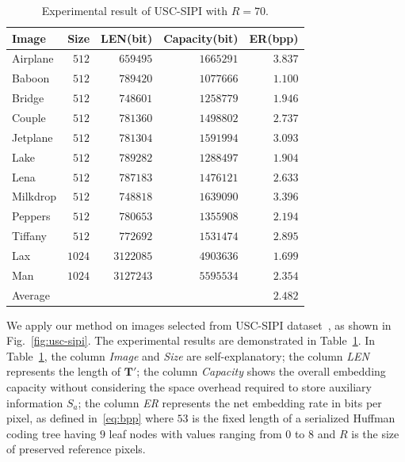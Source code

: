 \documentclass[journal]{IEEEtran}
\begin{document}
	\begin{table}[!t]
		\centering
		\caption{Experimental result of USC-SIPI with \(R = 70\).}
		\label{tab:usc}
		\begin{tabular}{l  r r r   r }
			\toprule
			Image 	  & Size   & LEN(bit)  & Capacity(bit) & ER(bpp)	\\ 
			\midrule
			Airplane  & $512$  & $659495$  & $1665291$ & $3.837$	\\
			Baboon    & $512$  & $789420$  & $1077666$ & $1.100$	\\
			Bridge    & $512$  & $748601$  & $1258779$ & $1.946$	\\
			Couple    & $512$  & $781360$  & $1498802$ & $2.737$	\\
			Jetplane  & $512$  & $781304$  & $1591994$ & $3.093$	\\
			Lake      & $512$  & $789282$  & $1288497$ & $1.904$	\\
			Lena      & $512$  & $787183$  & $1476121$ & $2.633$	\\
			Milkdrop  & $512$  & $748818$  & $1639090$ & $3.396$	\\
			Peppers   & $512$  & $780653$  & $1355908$ & $2.194$	\\
			Tiffany   & $512$  & $772692$  & $1531474$ & $2.895$	\\
			Lax       & $1024$ & $3122085$ & $4903636$ & $1.699$	\\
			Man       & $1024$ & $3127243$ & $5595534$ & $2.354$	\\
			\midrule
			Average	  & &&& $2.482$ \\
			\bottomrule
		\end{tabular}
	\end{table}
	
	We apply our method on images selected from USC-SIPI dataset~\cite{UniversityofSouthernCalifornia2020}, as shown in Fig.~\ref{fig:usc-sipi}.
	The experimental results are demonstrated in Table~\ref{tab:usc}. 
	In Table~\ref{tab:usc}, 
	the column \emph{Image} and \emph{Size} are self-explanatory; 
	the column \emph{LEN} represents the length of \(\mathbf{T'}\);
	the column \emph{Capacity} shows the overall embedding capacity without considering the space overhead required to store auxiliary information \(S_a\);
	the column \emph{ER} represents the net embedding rate in bits per pixel, as defined in~\eqref{eq:bpp} where \(53\) is the fixed length of a serialized Huffman coding tree having \(9\) leaf nodes with values ranging from \(0\) to \(8\) and \(R\) is the size of preserved reference pixels.
	
\end{document}
